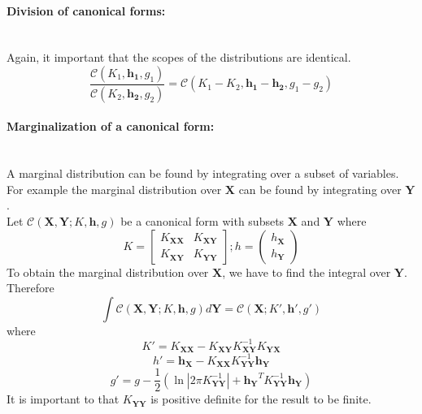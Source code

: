 \documentclass[12pt,oneside,openany,a4paper, %
afrikaans,english,
]{memoir}
\numberwithin{equation}{chapter}
\begin{document}
\paragraph{Division of canonical forms:}\mbox{}\\
Again, it important that the scopes of the distributions are identical.
\begin{equation}\label{eq:11}
\frac{\mathcal{C}(K_1,\bm{h_1},g_1)}{\mathcal{C}(K_2,\bm{h_2},g_2)} = \mathcal{C}(K_1 - K_2,\bm{h_1} - \bm{h_2},g_1 - g_2)
\end{equation}
\paragraph{Marginalization of a canonical form:}\mbox{}\\
A marginal distribution can be found by integrating over a subset of variables. For example the marginal distribution over $\bm{X}$ can be found by integrating over $\bm{Y}$.\\
Let $\mathcal{C}(\bm{X},\bm{Y};K,\bm{h},g)$ be a canonical form with subsets $\bm{X}$ and $\bm{Y}$ where
\begin{equation}
K = 
\begin{bmatrix}
K_{\bm{XX}} & K_{\bm{XY}}\\
K_{\bm{XY}} & K_{\bm{YY}}
\end{bmatrix}
 ; h = 
\begin{pmatrix}
h_{\bm{X}} \\
h_{\bm{Y}}
\end{pmatrix}
\end{equation}
To obtain the marginal distribution over $\bm{X}$, we have to find the integral over $\bm{Y}$. Therefore
\begin{equation}
\int\mathcal{C}(\bm{X},\bm{Y};K,\bm{h},g)d\bm{Y} = \mathcal{C}(\bm{X};K',\bm{h}',g')
\end{equation}
 where
\begin{equation}
K' = K_{\bm{XX}} - K_{\bm{XY}}K_{\bm{XY}}^{-1}K_{\bm{YX}}
\end{equation}
\begin{equation}
h' = \bm{h}_{\bm{X}} - K_{\bm{XX}}K_{\bm{YY}}^{-1}\bm{h}_{\bm{Y}}
\end{equation}
\begin{equation}
g' = g - \frac{1}{2}\left(\ln|2\pi K_{\bm{YY}}^{-1}|+ \bm{h_Y}^T K_{\bm{YY}}^{-1}\bm{h_Y}\right)
\end{equation}
It is important to that $K_{\bm{YY}}$ is positive definite for the result to be finite.
\end{document}
